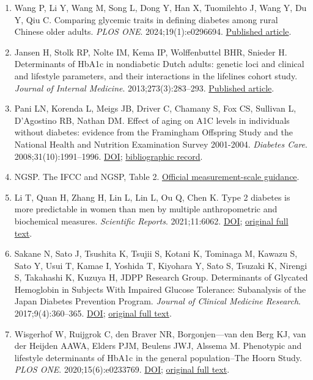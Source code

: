 \documentclass[10pt,twocolumn]{article}
\begin{document}
\begin{enumerate}
\item Wang P, Li Y, Wang M, Song L, Dong Y, Han X, Tuomilehto J, Wang Y, Du Y, Qiu C. Comparing glycemic traits in defining diabetes among rural Chinese older adults. \emph{PLOS ONE}. 2024;19(1):e0296694. \href{https://journals.plos.org/plosone/article?id=10.1371/journal.pone.0296694}{Published article}.

\item Jansen H, Stolk RP, Nolte IM, Kema IP, Wolffenbuttel BHR, Snieder H. Determinants of HbA1c in nondiabetic Dutch adults: genetic loci and clinical and lifestyle parameters, and their interactions in the lifelines cohort study. \emph{Journal of Internal Medicine}. 2013;273(3):283–293. \href{https://onlinelibrary.wiley.com/doi/10.1111/joim.12010}{Published article}.

\item Pani LN, Korenda L, Meigs JB, Driver C, Chamany S, Fox CS, Sullivan L, D'Agostino RB, Nathan DM. Effect of aging on A1C levels in individuals without diabetes: evidence from the Framingham Offspring Study and the National Health and Nutrition Examination Survey 2001-2004. \emph{Diabetes Care}. 2008;31(10):1991–1996. \href{https://doi.org/10.2337/dc08-0577}{DOI}; \href{https://pubmed.ncbi.nlm.nih.gov/18628569/}{bibliographic record}.

\item NGSP. The IFCC and NGSP, Table 2. \href{https://ngsp.org/ifccngsp.asp}{Official measurement-scale guidance}.

\item Li T, Quan H, Zhang H, Lin L, Lin L, Ou Q, Chen K. Type 2 diabetes is more predictable in women than men by multiple anthropometric and biochemical measures. \emph{Scientific Reports}. 2021;11:6062. \href{https://doi.org/10.1038/s41598-021-85581-z}{DOI}; \href{https://pmc.ncbi.nlm.nih.gov/articles/PMC7960723/}{original full text}.

\item Sakane N, Sato J, Tsushita K, Tsujii S, Kotani K, Tominaga M, Kawazu S, Sato Y, Usui T, Kamae I, Yoshida T, Kiyohara Y, Sato S, Tsuzaki K, Nirengi S, Takahashi K, Kuzuya H, JDPP Research Group. Determinants of Glycated Hemoglobin in Subjects With Impaired Glucose Tolerance: Subanalysis of the Japan Diabetes Prevention Program. \emph{Journal of Clinical Medicine Research}. 2017;9(4):360–365. \href{https://doi.org/10.14740/jocmr2928w}{DOI}; \href{https://pmc.ncbi.nlm.nih.gov/articles/PMC5330780/}{original full text}.

\item Wisgerhof W, Ruijgrok C, den Braver NR, Borgonjen—van den Berg KJ, van der Heijden AAWA, Elders PJM, Beulens JWJ, Alssema M. Phenotypic and lifestyle determinants of HbA1c in the general population–The Hoorn Study. \emph{PLOS ONE}. 2020;15(6):e0233769. \href{https://doi.org/10.1371/journal.pone.0233769}{DOI}; \href{https://pmc.ncbi.nlm.nih.gov/articles/PMC7272077/}{original full text}.


\end{enumerate}
\end{document}
